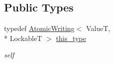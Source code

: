 \subsection*{Public Types}
\begin{DoxyCompactItemize}
\item 
\hypertarget{classhryky_1_1exclusion_1_1_atomic_writing_afc6301af19df5cf042e0cbed6d273b2a}{typedef \hyperlink{classhryky_1_1exclusion_1_1_atomic_writing}{Atomic\-Writing}$<$ Value\-T, \\*
Lockable\-T $>$ \hyperlink{classhryky_1_1exclusion_1_1_atomic_writing_afc6301af19df5cf042e0cbed6d273b2a}{this\-\_\-type}}\label{classhryky_1_1exclusion_1_1_atomic_writing_afc6301af19df5cf042e0cbed6d273b2a}

\begin{DoxyCompactList}\small\item\em self \end{DoxyCompactList}\end{DoxyCompactItemize}
